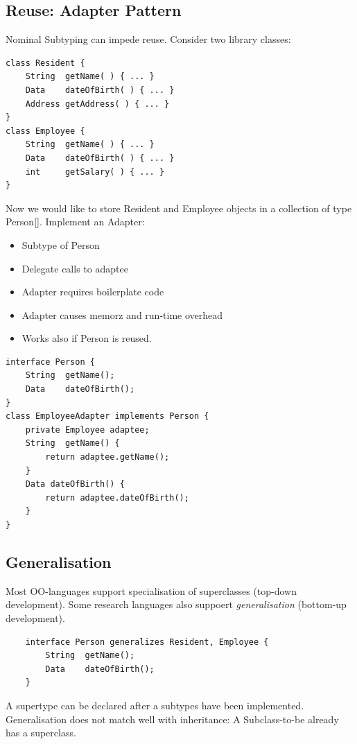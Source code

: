 \subsection{Reuse: Adapter Pattern}
Nominal Subtyping can impede reuse.  Consider two library classes:
\begin{lstlisting}
class Resident {
	String 	getName( ) { ... } 
	Data 	dateOfBirth( ) { ... }
	Address	getAddress( ) { ... } 
}
class Employee {
	String 	getName( ) { ... } 
	Data 	dateOfBirth( ) { ... } 
	int		getSalary( ) { ... }
}
\end{lstlisting}
Now we would like to store Resident and Employee objects in a collection of type Person[]. Implement an Adapter:
\begin{itemize}
	\item Subtype of Person
	\item Delegate calls to adaptee
	\item Adapter requires boilerplate code
	\item Adapter causes memorz and run-time overhead
	\item Works also if Person is reused.
\end{itemize}

\begin{lstlisting}[caption=Adapter Pattern]
interface Person { 
	String 	getName(); 
	Data 	dateOfBirth();
}
class EmployeeAdapter implements Person { 
	private	Employee adaptee;
	String	getName() {
		return adaptee.getName(); 
	} 
	Data dateOfBirth() { 
		return adaptee.dateOfBirth(); 
	}
}
\end{lstlisting}

\subsection{Generalisation}
Most OO-languages support specialisation of superclasses (top-down development). Some research languages also suppoert \emph{generalisation} (bottom-up development).
\begin{lstlisting}
	interface Person generalizes Resident, Employee {
		String	getName();
		Data	dateOfBirth();
	}
\end{lstlisting}
A supertype can be declared after a subtypes have been implemented. 
Generalisation does not match well with inheritance: A Subclass-to-be already has a superclass.


